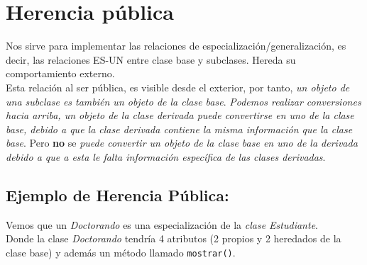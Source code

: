 \section{Herencia pública}

Nos sirve para implementar las relaciones de especialización/generalización, es decir, las relaciones ES-UN entre clase base y subclases.
Hereda su comportamiento externo.\\

Esta relación al ser pública, es visible desde el exterior, por tanto, \textit{un objeto de una subclase es también un objeto de la clase base}.
\textit{Podemos realizar conversiones hacia arriba, un objeto de la clase derivada puede convertirse en uno de la clase base, debido a que la clase derivada contiene la misma información que la clase base}.
Pero \textbf{no} se \textit{puede convertir un objeto de la clase base en uno de la derivada debido a que a esta le falta información específica de las clases derivadas}.

\subsection{Ejemplo de Herencia Pública:}
Vemos que un \textit{Doctorando} es una especialización de la \textit{clase Estudiante}.\\
Donde la clase \textit{Doctorando} tendría 4 atributos (2 propios y 2 heredados de la clase base) y además un método llamado \texttt{mostrar()}.

